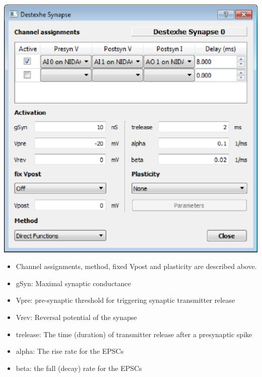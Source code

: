 \documentclass{article}
\begin{document}
\parbox[b]{0.48\textwidth}{
\includegraphics[scale=0.5]{destexheSynDialog} \\[1.5cm]}
\hfill
\parbox[b]{0.5\textwidth}{
\begin{itemize}
\item Channel assignments, method, fixed Vpost and plasticity are described above.
\item gSyn: Maximal synaptic conductance
\item Vpre: pre-synaptic threshold for triggering synaptic transmitter
  release
\item Vrev: Reversal potential of the synapse
\item trelease: The time (duration) of transmitter release after a
  presynaptic spike
\item alpha: The rise rate for the EPSCs
\item beta: the fall (decay) rate for the EPSCs
\end{itemize}
}
\end{document}
